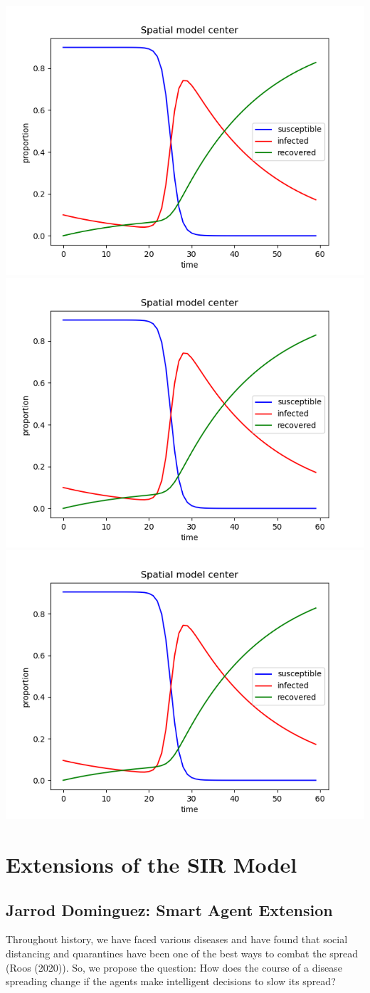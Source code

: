 \documentclass[twoside]{extarticle}                                    %
\numberwithin{equation}{section}                                       %
\begin{document}
\begin{center}
    \includegraphics[trim = {0.5cm 0 0.5cm 0.5cm}, clip, width = 0.40\linewidth]{../plots/spatial_center.png} \qquad
    \includegraphics[trim = {0.5cm 0 0.5cm 0.5cm}, clip, width = 0.40\linewidth]{../plots/spatial_corner.png} \\
    \includegraphics[trim = {0.5cm 0 0.5cm 0.5cm}, clip, width = 0.40\linewidth]{../plots/spatial_random.png}
\end{center}


\section{Extensions of the SIR Model}
\subsection{Jarrod Dominguez: Smart Agent Extension}
Throughout history, we have faced various diseases and have found that social distancing and quarantines have been one of the best ways to combat the spread (Roos (2020)). So, we propose the question: How does the course of a disease spreading change if the agents make intelligent decisions to slow its spread?
\end{document}
